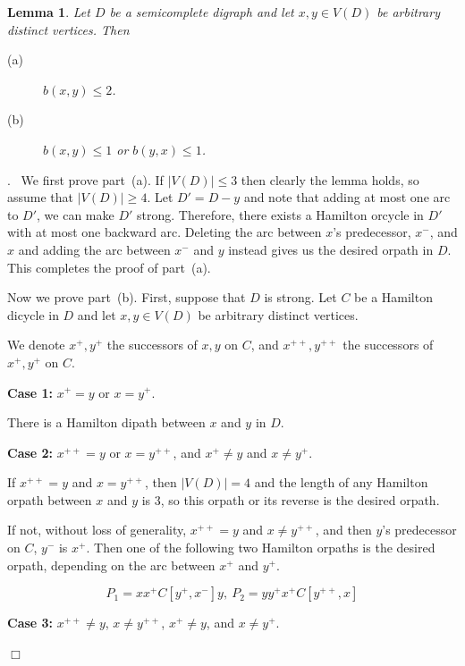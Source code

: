 \documentclass{article}
\newcommand{\2}{\vspace{2mm}}
\renewenvironment{proof}[1][]{\par \noindent {\bf Proof#1}.\ }{\hfill$\Box$
\par \vspace{11pt}}
\newtheorem{lemma}[theorem]{Lemma}
\theoremstyle{definition}
\begin{document}
\begin{lemma} \label{lem: XYpathSemiC}
Let $D$ be a semicomplete digraph and let $x,y \in V(D)$ be arbitrary distinct vertices. Then 
\begin{description}
\item[(a)] $b(x,y)\le2$.

\item[(b)] $b(x,y)\le 1$ or $b(y,x)\le 1$.
\end{description}
\end{lemma}

\begin{proof}
We first prove part~(a).
If $|V(D)| \le 3$ then clearly the lemma holds, so assume that  $|V(D)| \geq 4$.
Let $D' = D - y$ and note that adding at most one arc to $D'$, we can make $D'$ strong.  Therefore, there exists a Hamilton orcycle in $D'$ with 
at most one backward arc. Deleting the arc between $x$'s predecessor, $x^-$, and $x$ and adding the arc between $x^-$ and $y$ instead gives us the desired orpath in $D$.
This completes the proof of part~(a).

Now we prove part~(b).
First, suppose that $D$ is strong. Let $C$ be a Hamilton dicycle in $D$ and let $x,y \in V(D)$ be arbitrary distinct vertices.

We denote $x^+,y^+$ the successors of $x,y$ on $C$, and $x^{++},y^{++}$ the successors of $x^+,y^+$ on $C$.

\vspace{0.5em}
\textbf{Case 1:} $x^+=y$ or $x=y^+$.

There is a Hamilton dipath between $x$ and $y$ in $D$.

\vspace{0.5em}
\textbf{Case 2:} $x^{++}=y$ or $x=y^{++}$, and $x^+\ne y$ and $x\ne y^+$.

If $x^{++}=y$ and $x=y^{++}$, then $|V(D)|=4$ and the length of any Hamilton orpath between $x$ and $y$ is $3$, so this orpath or its reverse is the desired orpath.

If not, without loss of generality, $x^{++}=y$ and $x\ne y^{++}$, and then  $y$'s predecessor on $C$, $y^-$ is $x^+$. Then one of the following two Hamilton orpaths is the desired orpath, depending on the arc between $x^+$ and $y^+$.

\[
P_1=x x^+ C[y^+, x^-] y,~P_2=y y^+ x^+ C[y^{++}, x]
\]

\vspace{0.5em}
\textbf{Case 3:} $x^{++}\ne y$, $x\ne y^{++}$, $x^+\ne y$, and $x\ne y^+$.


\end{proof}
\end{document}
